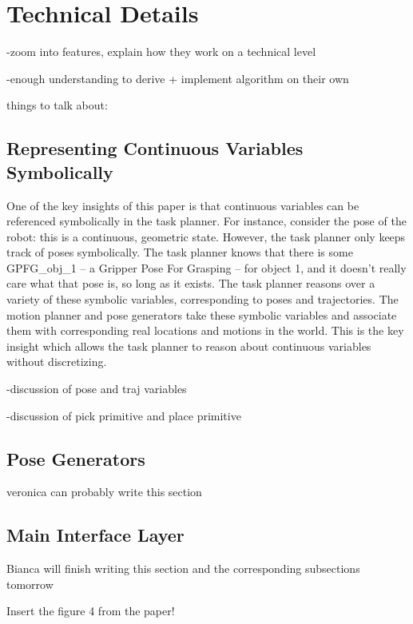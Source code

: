 \documentclass[12pt]{article}
\begin{document}
\section{Technical Details}

-zoom into features, explain how they work on a technical level

-enough understanding to derive + implement algorithm on their own

things to talk about:

\subsection{Representing Continuous Variables Symbolically}

One of the key insights of this paper is that continuous variables can be referenced symbolically in the task planner.  
For instance, consider the pose of the robot: this is a continuous, geometric state.  However, the task planner only keeps track of poses symbolically.  
The task planner knows that there is some GPFG\_obj\_1 -- a Gripper Pose For Grasping -- for object 1, and it doesn't really care what that pose is, so long as it exists.  
The task planner reasons over a variety of these symbolic variables, corresponding to poses and trajectories.  
The motion planner and pose generators take these symbolic variables and associate them with corresponding real locations and motions in the world.  
This is the key insight which allows the task planner to reason about continuous variables without discretizing.  

-discussion of pose and traj variables

-discussion of pick primitive and place primitive


\subsection{Pose Generators}

veronica can probably write this section

\subsection{Main Interface Layer}

Bianca will finish writing this section and the corresponding subsections tomorrow

Insert the figure 4 from the paper!
\end{document}
